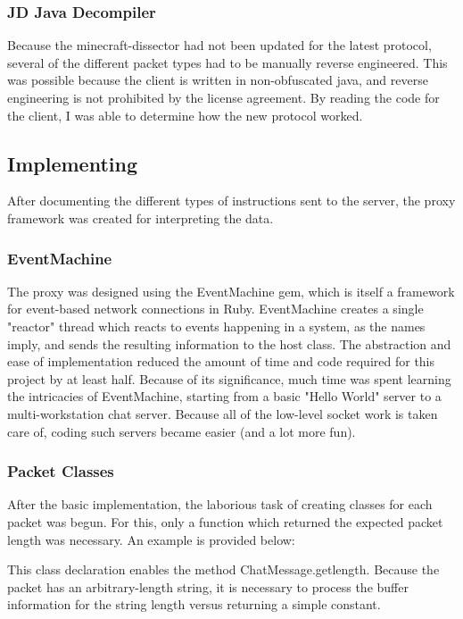 \documentclass[12pt]{article}
\begin{document}
\subsubsection{JD Java Decompiler}
Because the minecraft-dissector had not been updated for the latest protocol, several of the different packet types had to be manually reverse engineered. This was possible because the client is written in non-obfuscated java, and reverse engineering is not prohibited by the license agreement. By reading the code for the client, I was able to determine how the new protocol worked.

\subsection{Implementing}
After documenting the different types of instructions sent to the server, the proxy framework was created for interpreting the data.

\subsubsection{EventMachine}
The proxy was designed using the EventMachine gem, which is itself a framework for event-based network connections in Ruby. EventMachine creates a single "reactor" thread which reacts to events happening in a system, as the names imply, and sends the resulting information to the host class. The abstraction and ease of implementation reduced the amount of time and code required for this project by at least half. Because of its significance, much time was spent learning the intricacies of EventMachine, starting from a basic "Hello World" server to a multi-workstation chat server. Because all of the low-level socket work is taken care of, coding such servers became easier (and a lot more fun).

\subsubsection{Packet Classes}
After the basic implementation, the laborious task of creating classes for each packet was begun. For this, only a function which returned the expected packet length was necessary. An example is provided below:

This class declaration enables the method ChatMessage.get\textunderscore{}length. Because the packet has an arbitrary-length string, it is necessary to process the buffer information for the string length versus returning a simple constant.
\end{document}
